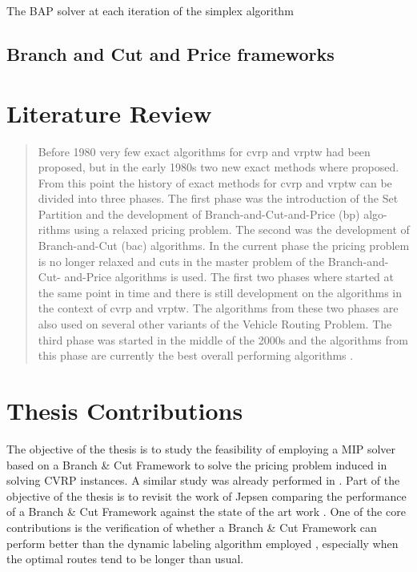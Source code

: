 The BAP solver at each iteration of the simplex algorithm



\subsection{Branch and Cut and Price frameworks}

\section{Literature Review}

\begin{quote}
	Before 1980 very few exact algorithms for cvrp and vrptw had been
	proposed, but in the early 1980s two new exact methods where proposed.
	From this point the history of exact methods for cvrp and vrptw can
	be divided into three phases. The first phase was the introduction of the
	Set Partition and the development of Branch-and-Cut-and-Price (bp) algo-
	rithms using a relaxed pricing problem. The second was the development of
	Branch-and-Cut (bac) algorithms. In the current phase the pricing problem
	is no longer relaxed and cuts in the master problem of the Branch-and-Cut-
	and-Price algorithms is used. The first two phases where started at the same
	point in time and there is still development on the algorithms in the context
	of cvrp and vrptw. The algorithms from these two phases are also used
	on several other variants of the Vehicle Routing Problem. The third phase
	was started in the middle of the 2000s and the algorithms from this phase
	are currently the best overall performing algorithms \cite{jepsen_branch-and-cut_2011}.
\end{quote}

\section{Thesis Contributions}
The objective of the thesis is to study the feasibility of employing a MIP solver
based on a Branch \& Cut Framework to solve the pricing problem induced in solving
CVRP instances.
A similar study was already performed in \cite{Jepsen2014}.
Part of the objective of the thesis is to revisit the work of Jepsen comparing
the performance of a Branch \& Cut Framework against the state of the art work
\cite{pessoa2020generic}.
One of the core contributions is the verification of whether a Branch \& Cut Framework
can perform better than the dynamic labeling algorithm employed \cite{pessoa2020generic},
especially when the optimal routes tend to be longer than usual.


